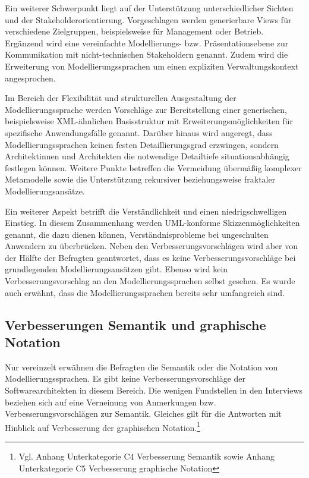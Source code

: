 Ein weiterer Schwerpunkt liegt auf der Unterstützung unterschiedlicher Sichten und der Stakeholderorientierung. Vorgeschlagen werden generierbare Views für verschiedene Zielgruppen, beispielsweise für Management oder Betrieb. Ergänzend wird eine vereinfachte Modellierungs- bzw. Präsentationsebene zur Kommunikation mit nicht-technischen Stakeholdern genannt. Zudem wird die Erweiterung von Modellierungssprachen um einen expliziten Verwaltungskontext angesprochen.

Im Bereich der Flexibilität und strukturellen Ausgestaltung der Modellierungssprache werden Vorschläge zur Bereitstellung einer generischen, beispielsweise XML-ähnlichen Basisstruktur mit Erweiterungsmöglichkeiten für spezifische Anwendungsfälle genannt. Darüber hinaus wird angeregt, dass Modellierungssprachen keinen festen Detaillierungsgrad erzwingen, sondern Architektinnen und Architekten die notwendige Detailtiefe situationsabhängig festlegen können. Weitere Punkte betreffen die Vermeidung übermäßig komplexer Metamodelle sowie die Unterstützung rekursiver beziehungsweise fraktaler Modellierungsansätze.

Ein weiterer Aspekt betrifft die Verständlichkeit und einen niedrigschwelligen Einstieg. In diesem Zusammenhang werden UML-konforme Skizzenmöglichkeiten genannt, die dazu dienen können, Verständnisprobleme bei ungeschulten Anwendern zu überbrücken.
Neben den Verbesserungsvorschlägen wird aber von der Hälfte der Befragten geantwortet, dass es keine Verbesserungsvorschläge bei grundlegenden Modellierungsansätzen gibt. Ebenso wird kein Verbesserungsvorschlag an den Modellierungssprachen selbst gesehen.  Es wurde auch erwähnt, dass die Modellierungssprachen bereits sehr umfangreich sind.

\subsection{Verbesserungen Semantik und graphische Notation}

Nur vereinzelt erwähnen die Befragten die Semantik oder die Notation von Modellierungssprachen. Es gibt keine Verbesserungsvorschläge der Softwarearchitekten in diesem Bereich. Die wenigen Fundstellen in den Interviews beziehen sich auf eine Verneinung von Anmerkungen bzw. Verbesserungsvorschlägen zur Semantik. Gleiches gilt für die Antworten mit Hinblick auf Verbesserung der graphischen Notation.\footnote{Vgl. Anhang Unterkategorie C4 Verbesserung Semantik  sowie Anhang Unterkategorie C5 Verbesserung graphische Notation}

